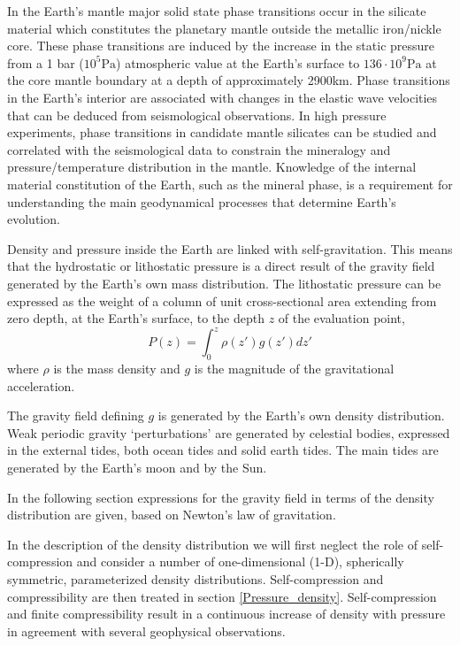 In the Earth's mantle major solid state phase transitions occur in the 
silicate material which constitutes the planetary mantle
outside the metallic iron/nickle core.
These phase transitions are induced by the increase in the static
pressure from a 1 bar ($10^5\si{\pascal}$) atmospheric value at the Earth's surface to 
$136 \cdot 10^9\si{\pascal}$ at the core mantle boundary at a depth of
approximately 2900\si{\kilo\metre}.
Phase transitions in the Earth's interior are associated with changes 
in the elastic wave velocities that can be deduced from seismological 
observations.
In high pressure experiments, phase transitions in candidate mantle
silicates can be studied and correlated with the seismological data
to constrain the mineralogy and pressure/temperature distribution 
in the mantle.
Knowledge of the internal material constitution of the Earth,
such as the mineral phase,
is a requirement for understanding the main geodynamical processes that determine
Earth's evolution.

Density and pressure inside the Earth are linked with self-gravitation.
This means that the hydrostatic or lithostatic pressure is a direct 
result of the gravity field generated by the Earth's own mass 
distribution.
The lithostatic pressure can be expressed as the weight of a column
of unit cross-sectional area extending from zero depth, at the Earth's 
surface, to the depth $z$ of the evaluation point,
\begin{equation}
 P(z) = \int_0^z \rho(z') g(z') dz'
\label{def_pressure_integ}
\end{equation}
where $\rho$ is the mass density and $g$ is the magnitude of
the gravitational acceleration.

The gravity field defining $g$ is generated by the Earth's own density 
distribution.
Weak periodic gravity `perturbations' are generated by celestial
bodies, expressed in the external tides, both ocean tides and solid
earth tides.
The main tides are generated by the Earth's moon and by the Sun.

In the following section expressions for the gravity field in terms
of the density distribution are given, based on Newton's law of
gravitation.

In the description of the density distribution we will first neglect 
the role of self-compression and consider a number of one-dimensional 
(1-D), spherically symmetric, parameterized density distributions.
Self-compression and compressibility are then treated in section 
\ref{Pressure_density}.
Self-compression and finite compressibility result in a 
continuous increase of density with pressure in agreement 
with several geophysical observations.  

